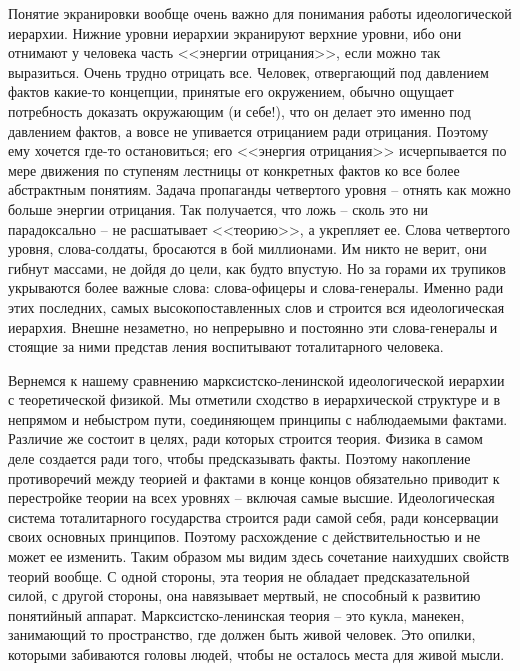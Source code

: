 \documentclass{book}
\begin{document}
Понятие экранировки вообще очень важно для понимания работы идеологической иерар\-хии. Нижние уровни иерархии экранируют верхние 
уровни, ибо они отнимают у человека часть <<энергии отрицания>>, если можно так выразиться. Очень трудно отрицать все. Человек, 
отвергающий под давлением фактов какие-то концепции, принятые его окружением, обыч­но ощущает потребность доказать окружающим (и 
себе!), что он делает это именно под давлением фактов, а вовсе не упива­ется отрицанием ради отрицания. Поэтому ему хочется 
где-то остановиться; его <<энергия отрицания>> исчерпывается по мере движения по ступеням лестницы от конкретных фактов ко все 
более абстрактным понятиям. Задача пропаганды четвер­того уровня -- отнять как можно больше энергии отрицания. Так получается, 
что ложь -- сколь это ни парадоксально -- не расшатывает <<теорию>>, а укрепляет ее. Слова четвертого уров­ня, слова-солдаты, 
бросаются в бой миллионами. Им никто не верит, они гибнут массами, не дойдя до цели, как будто впустую. Но за горами их трупиков 
укрываются более важные слова: слова-офицеры и слова-генералы. Именно ради этих последних, самых высокопоставленных слов и 
строится вся идеологическая иерархия. Внешне незаметно, но непрерывно и постоянно эти слова-генералы и стоящие за ними представ­
ления воспитывают тоталитарного человека.

Вернемся к нашему сравнению марксистско-ленинской идеологической иерархии с теоретической физикой. Мы отме­тили сходство в 
иерархической структуре и в непрямом и не­быстром пути, соединяющем принципы с наблюдаемыми фак­тами. Различие же состоит в целях, 
ради которых строится теория. Физика в самом деле создается ради того, чтобы пред­сказывать факты. Поэтому накопление 
противоречий между теорией и фактами в конце концов обязательно приводит к пе­рестройке теории на всех уровнях -- включая самые 
высшие. Идеологическая система тоталитарного государства строится ради самой себя, ради консервации своих основных принци­пов. 
Поэтому расхождение с действительностью и не может ее изменить. Таким образом мы видим здесь сочетание наихуд­ших свойств теорий 
вообще. С одной стороны, эта теория не обладает предсказательной силой, с другой стороны, она навя­зывает мертвый, не способный к 
развитию понятийный аппа­рат. Марксистско-ленинская теория -- это кукла, манекен, занимающий то пространство, где должен быть 
живой человек. Это опилки, которыми забиваются головы людей, чтобы не осталось места для живой мысли.
\end{document}
